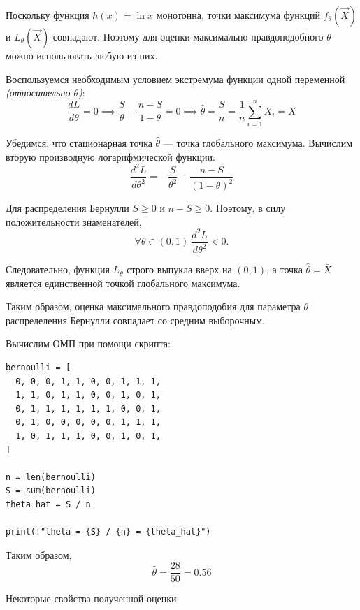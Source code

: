 Поскольку функция \( h(x)=\ln x \) монотонна, точки максимума функций \( f_\theta(\vec{X}) \) и \( L_\theta(\vec{X}) \) совпадают. Поэтому для оценки максимально правдоподобного \( \theta \) можно использовать любую из них.

Воспользуемся необходимым условием экстремума функции одной переменной \textit{(относительно \( \theta \))}:
\[
    \frac{dL}{d\theta} = 0\implies\frac{S}{\theta} - \frac{n-S}{1-\theta} = 0 \implies \hat{\theta} = \frac{S}{n} = \dfrac{1}{n}\sum_{i=1}^nX_i=\overline{X}
\]

Убедимся, что стационарная точка $\hat{\theta}$ --- точка глобального максимума. Вычислим вторую производную логарифмической функции:
\[
    \dfrac{d^2L}{d\theta^2} = -\frac{S}{\theta^2} - \frac{n - S}{(1 - \theta)^2}
\]

Для распределения Бернулли $S \geq 0$ и $n-S \geq 0$. Поэтому, в силу положительности знаменателей,
\[
    \forall\theta\in(0,1)\ \dfrac{d^2L}{d\theta^2}<0.
\]

Следовательно, функция $L_\theta$ строго выпукла вверх на $(0,1)$, а точка $\hat{\theta} = \bar{X}$ является единственной точкой глобального максимума.

Таким образом, оценка максимального правдоподобия для параметра $\theta$ распределения Бернулли совпадает со средним выборочным.

Вычислим ОМП при помощи скрипта:

\begin{lstlisting}[caption=Расчёт ОМП]
bernoulli = [
  0, 0, 0, 1, 1, 0, 0, 1, 1, 1,
  1, 1, 0, 1, 1, 0, 0, 1, 0, 1,
  0, 1, 1, 1, 1, 1, 1, 0, 0, 1,
  0, 1, 0, 0, 0, 0, 0, 1, 1, 1,
  1, 0, 1, 1, 1, 0, 0, 1, 0, 1,
]

n = len(bernoulli)
S = sum(bernoulli)
theta_hat = S / n

print(f"theta = {S} / {n} = {theta_hat}")
\end{lstlisting}

Таким образом,
\[
\hat{\theta} = \dfrac{28}{50} = 0.56
\]

Некоторые свойства полученной оценки:

